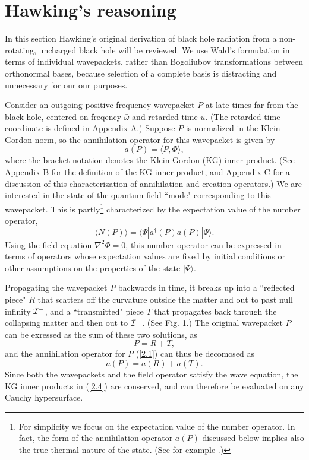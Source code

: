 \documentclass[12pt]{article}
\def\obar{\bar{\omega}}
\def\ubar{\bar{u}}
\def\la{\langle}
\def\ra{\rangle}
\begin{document}
\section{Hawking's reasoning}
\label{sec:2}

In this section Hawking's original derivation \cite{Hawk75}
of black hole  radiation from a non-rotating, uncharged
black hole will be reviewed. We use Wald's formulation
\cite{Wald75} in terms  of individual wavepackets, rather
than Bogoliubov transformations between orthonormal bases,
because selection of a complete basis is distracting and
unnecessary for our our purposes.

Consider an outgoing positive frequency wavepacket $P$ at late
times far from the black hole, centered on
freqency $\obar$ and retarded time $\ubar$.
(The retarded time coordinate is
defined in Appendix A.) Suppose $P$ is normalized in the
Klein-Gordon norm, so the annihilation operator for this
wavepacket is given by
\begin{equation}
a(P)=\langle P,\Phi\rangle,
\label{2.1}
\end{equation}
where the bracket
notation denotes the Klein-Gordon (KG) inner product. (See
Appendix B for the definition of the KG inner product,
and Appendix C for a discussion of this
characterization of annihilation and creation operators.)
We are interested in the state of the quantum
field ``mode" corresponding to this wavepacket.
This is partly\footnote{For simplicity we focus on the
expectation value of the number operator. In fact, the form
of the annihilation operator $a(P)$ discussed below implies
also the true thermal nature of the state. (See for example
\cite{Wald75,DeWitt,Sork}.)}
characterized by the expectation value of the number operator,
\begin{equation} \la N(P)\ra
=\la\Psi|a^{\dagger}(P)a(P)|\Psi\ra.
\end{equation}
Using the field equation $\nabla^2\Phi=0$, this number operator
can be expressed  in terms of operators whose expectation
values are fixed by initial conditions or other assumptions
on the properties of the state $|\Psi\ra$.

Propagating the wavepacket $P$ backwards in time, it
breaks up into a ``reflected piece" $R$ that scatters
off the curvature outside the matter and out to past null
infinity ${\cal I}^-$, and a ``transmitted" piece $T$
that propagates back through the collapsing matter and
then out to ${\cal I}^-$. (See Fig. 1.)
The original wavepacket $P$ can be
exressed as the sum of these two solutions, as
\begin{equation} P=R+T,
\end{equation}
and the annihilation operator for $P$ (\ref{2.1}) can thus
be decomosed as
\begin{equation} a(P)=a(R)+a(T).
\label{2.4}
\end{equation}
Since both the wavepackets and the field operator satisfy
the wave equation,
the KG inner products in (\ref{2.4}) are conserved, and can
therefore be evaluated on any Cauchy hypersurface.
\end{document}

